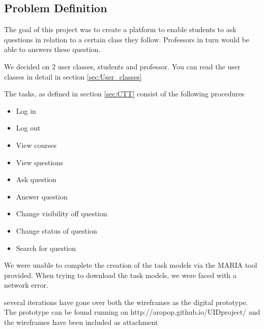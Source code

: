 \subsection{Problem Definition}
The goal of this project was to create a platform to enable students to ask questions in relation to a certain class they follow. Professors in turn would be able to answers these question.

We decided on 2 user classes, students and professor. You can read the user classes in detail in section \ref{sec:User_classes}

The tasks, as defined in section \ref{sec:CTT} consist of the following procedures

\begin{itemize}
\item Log in
\item Log out
\item View courses
\item View questions
\item Ask question
\item Answer question
\item Change visibility off question
\item Change status of question
\item Search for question
\end{itemize}

We were unable to complete the creation of the task models via the MARIA tool provided. When trying to download the task models, we were faced with a network error.

several iterations have gone over both the wireframes as the digital prototype. The prototype can be found running on http://aropop.github.io/UIDproject/ and the wireframes have been included as attachment 